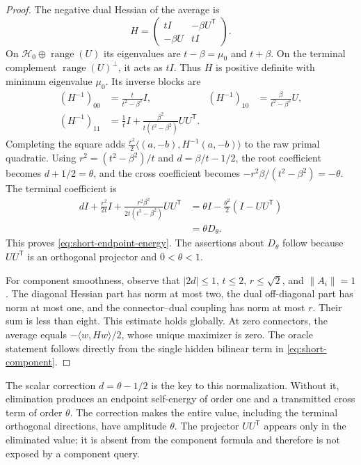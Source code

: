 \documentclass[11pt,letterpaper]{article}
\theoremstyle{definition}
\theoremstyle{remark}
\begin{document}
\begin{proof}
The negative dual Hessian of the average is
\[
 H=\begin{pmatrix}
 tI&-\beta U^{\mathsf T}\\
 -\beta U&tI
 \end{pmatrix}.
\]
On $\mathcal H_0\oplus\operatorname{range}(U)$ its eigenvalues are
$t-\beta=\mu_0$ and $t+\beta$.  On the terminal complement
$\operatorname{range}(U)^\perp$, it acts as $tI$.
Thus $H$ is positive definite with minimum eigenvalue $\mu_0$.
Its inverse blocks are
\begin{align*}
 (H^{-1})_{00}&=\frac t{t^2-\beta^2}I,
 & (H^{-1})_{10}&=\frac\beta{t^2-\beta^2}U,\\
 (H^{-1})_{11}&=\frac1tI
          +\frac{\beta^2}{t(t^2-\beta^2)}UU^{\mathsf T}.
\end{align*}
Completing the square adds
$\tfrac{r^2}{2}\langle(a,-b),H^{-1}(a,-b)\rangle$
to the raw primal quadratic.  Using
$r^2=(t^2-\beta^2)/t$ and $d=\beta/t-1/2$, the root coefficient becomes
$d+1/2=\theta$, and the cross coefficient becomes
$-r^2\beta/(t^2-\beta^2)=-\theta$.
The terminal coefficient is
\begin{align*}
 dI+\frac{r^2}{2t}I
       +\frac{r^2\beta^2}{2t(t^2-\beta^2)}UU^{\mathsf T}
 &=\theta I-\frac{\theta^2}{2}(I-UU^{\mathsf T})\\
 &=\theta D_\theta.
\end{align*}
This proves \eqref{eq:short-endpoint-energy}.  The assertions about
$D_\theta$ follow because $UU^{\mathsf T}$ is an orthogonal projector
and $0<\theta<1$.

For component smoothness, observe that
$|2d|\le1$, $t\le2$, $r\le\sqrt2$, and $\|A_i\|=1$.
The diagonal Hessian part has norm at most two, the dual off-diagonal
part has norm at most one, and the connector--dual coupling has norm
at most $r$.  Their sum is less than eight.  This estimate holds
globally.  At zero connectors, the average equals
$-\langle w,Hw\rangle/2$, whose unique maximizer is zero.
The oracle statement follows directly from the single hidden bilinear
term in \eqref{eq:short-component}.
\end{proof}

The scalar correction $d=\theta-1/2$ is the key to this normalization.
Without it, elimination produces an endpoint self-energy of order one
and a transmitted cross term of order $\theta$.
The correction makes the entire value, including the terminal
orthogonal directions, have amplitude $\theta$.
The projector $UU^{\mathsf T}$ appears only in the eliminated value;
it is absent from the component formula and therefore is not exposed
by a component query.
\end{document}
